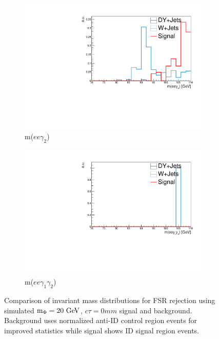 \begin{figure}[htb!]
\begin{subfigure}[h]{.32\linewidth}
		\includegraphics[width=\linewidth]{figs/05_analysis/2018_ZX_Zg2_mass_ELE_preFSR_mx20_comp.pdf}
		\caption{m($ee\gamma_2$)}
	\end{subfigure}
	\begin{subfigure}[h]{.32\linewidth}
		\centering
		\includegraphics[width=\linewidth]{figs/05_analysis/2018_ZX_mass_ELE_preFSR_mx20_comp.pdf}
		\caption{m($ee\gamma_1\gamma_2$)}
	\end{subfigure}
	\caption[Comparison of invariant mass distributions for FSR rejection using simulated $\mphi=20\unit{GeV}$, $c\tau=0\unit{mm}$ signal and background. Background uses normalized anti-ID control region events for improved statistics while signal shows ID signal region events.]{Comparison of invariant mass distributions for FSR rejection using simulated $\mphi=20\unit{GeV}$, $c\tau=0\unit{mm}$ signal and background. Background uses normalized anti-ID control region events for improved statistics while signal shows ID signal region events.}
	\label{fig:fsr_distributions}
\end{figure}

